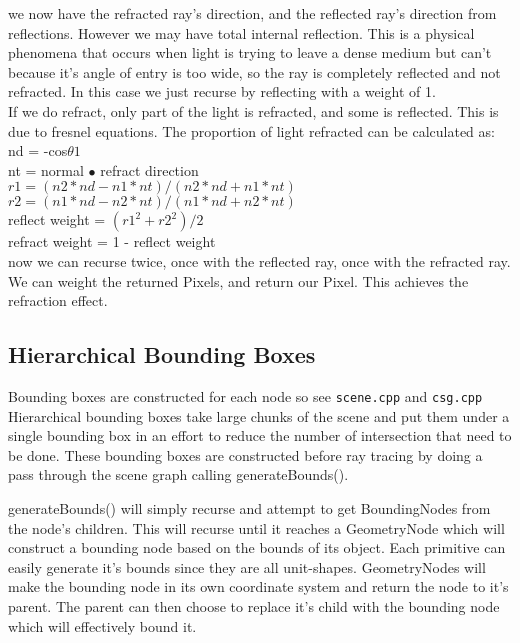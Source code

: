 \documentclass {article}
\begin{document}
we now have the refracted ray's direction, and the reflected ray's direction
from reflections.  However we may have total internal reflection.  This is a
physical phenomena that occurs when light is trying to leave a dense medium but
can't because it's angle of entry is too wide, so the ray is completely
reflected and not refracted.  In this case we just recurse by reflecting with a
weight of 1.\\

If we do refract, only part of the light is refracted, and some is reflected.
This is due to fresnel equations.  The proportion of light refracted can be
calculated as:\\

\noindent nd = -cos$\theta1$\\
nt = normal $\bullet$ refract direction\\
$r1 = (n2 * nd - n1 * nt) / (n2 * nd + n1 * nt)$\\
$r2 = (n1 * nd - n2 * nt) / (n1 * nd + n2 * nt)$\\
reflect weight = $(r1^2 + r2^2) / 2$\\
refract weight = 1 - reflect weight\\

\noindent now we can recurse twice, once with the reflected ray, once with the refracted
ray.  We can weight the returned Pixels, and return our Pixel.  This achieves
the refraction effect.\\

\subsection{Hierarchical Bounding Boxes}
Bounding boxes are constructed for each node so see \verb!scene.cpp! and
\verb!csg.cpp!\\

Hierarchical bounding boxes take large chunks of the scene and put them under a
single bounding box in an effort to reduce the number of intersection that need
to be done.  These bounding boxes are constructed before ray tracing by doing a
pass through the scene graph calling generateBounds().

generateBounds() will simply recurse and attempt to get BoundingNodes from the
node's children.  This will recurse until it reaches a GeometryNode which will
construct a bounding node based on the bounds of its object.  Each primitive can
easily generate it's bounds since they are all unit-shapes.  GeometryNodes will
make the bounding node in its own coordinate system and return the node to it's
parent.  The parent can then choose to replace it's child with the bounding node
which will effectively bound it.\\
\end{document}
